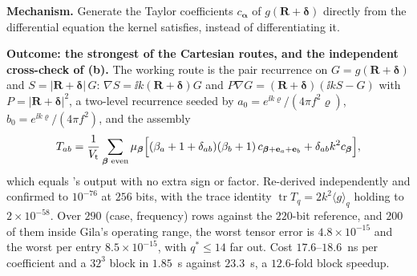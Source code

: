 \textbf{Mechanism.} Generate the Taylor coefficients $c_{\boldsymbol{\alpha}}$ of
$g(\mathbf{R}+\boldsymbol{\delta})$ directly from the differential equation the kernel
satisfies, instead of differentiating it.

\textbf{Outcome: the strongest of the Cartesian routes, and the independent cross-check of
(b).} The working route is the pair recurrence on $G = g(\mathbf{R}+\boldsymbol{\delta})$
and $S = |\mathbf{R}+\boldsymbol{\delta}|\,G$: $\nabla S = \ii k(\mathbf{R}+
\boldsymbol{\delta})G$ and $P\nabla G = (\mathbf{R}+\boldsymbol{\delta})(\ii kS - G)$ with
$P = |\mathbf{R}+\boldsymbol{\delta}|^2$, a two-level recurrence seeded by
$a_0 = e^{\ii k\varrho}/(4\pi f^2\varrho)$, $b_0 = e^{\ii k\varrho}/(4\pi f^2)$, and the
assembly
\[
T_{ab} = \frac{1}{V_{\mathrm{t}}}\sum_{\boldsymbol{\beta}\text{ even}}
\mu_{\boldsymbol{\beta}}\Bigl[(\beta_a+1+\delta_{ab})(\beta_b+1)\,
c_{\boldsymbol{\beta}+\mathbf{e}_a+\mathbf{e}_b} + \delta_{ab}k^2c_{\boldsymbol{\beta}}
\Bigr],
\]
which equals 's output with no extra sign or factor. Re-derived
independently and confirmed to $10^{-76}$ at $256$ bits, with the trace identity
$\operatorname{tr}T_q = 2k^2\langle g\rangle_q$ holding to $2\times10^{-58}$. Over $290$
(case, frequency) rows against the $220$-bit reference, and $200$ of them inside Gila's
operating range, the worst tensor error is $4.8\times10^{-15}$ and the worst per entry
$8.5\times10^{-15}$, with $q^* \le 14$ far out. Cost $17.6$--$18.6$~ns per coefficient
and a $32^3$ block in $1.85$~s against $23.3$~s, a $12.6$-fold block speedup.


